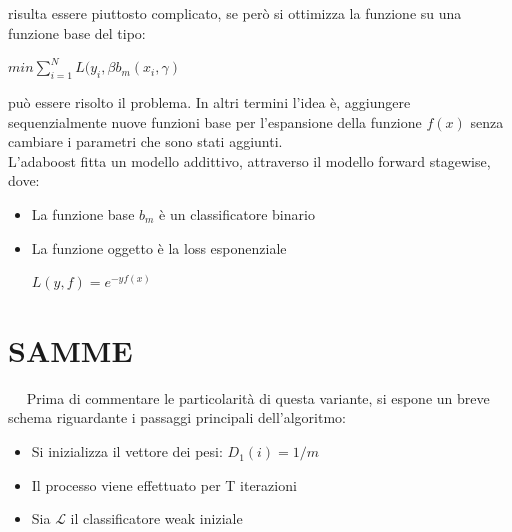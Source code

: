 risulta essere piuttosto complicato, se per\`o si ottimizza la funzione su una funzione base del tipo:
\begin{center}
 \begin{math}
  min \sum_{i=1}^N L(y_i,\beta b_m(x_i,\gamma)
 \end{math}
\end{center}
pu\`o essere risolto il problema. In altri termini l'idea \`e, aggiungere sequenzialmente nuove funzioni base 
per l'espansione della funzione \begin{math}f(x)\end{math} senza cambiare i parametri che sono stati aggiunti.\\
\newline
L'adaboost fitta un modello addittivo, attraverso il modello forward stagewise, dove:
\begin{itemize}
 \item La funzione base \begin{math}b_m\end{math} \`e un classificatore binario
 \item La funzione oggetto \`e la loss esponenziale
\begin{center}
\begin{math} L(y,f) = e^{-yf(x)} \end{math}
\end{center}
\end{itemize}


\section{SAMME}
\ \
\newline
Prima di commentare le particolarit\`a di questa variante, si espone un breve schema riguardante 
i passaggi principali dell'algoritmo:\\
\newline

\begin{itemize}
\item Si inizializza il vettore dei pesi: \begin{math} D_1(i)=1/m \end{math}
\item Il processo viene effettuato per T iterazioni
\item Sia \begin{math} \mathcal{L} \end{math} il classificatore weak iniziale
\end{itemize}


